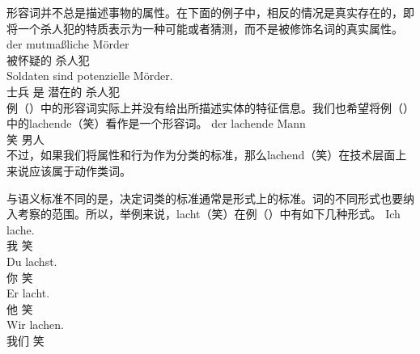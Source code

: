 形容词并不总是描述事物的属性。在下面的例子中，相反的情况是真实存在的，即将一个杀人犯的特质表示为一种可能或者猜测，而不是被修饰名词的真实属性。
\eal
\ex 
\gll der mutmaßliche Mörder\\
      被怀疑的 杀人犯\\
\ex 
\gll Soldaten sind potenzielle Mörder.\\
     士兵 是 潜在的 杀人犯\\
\zl
例（）中的形容词实际上并没有给出所描述实体的特征信息。我们也希望将例（）中的lachende（笑）看作是一个形容词。
\ea
\gll der lachende Mann\\
	  笑 男人\\
\z
不过，如果我们将属性和行为作为分类的标准，那么lachend（笑）在技术层面上来说应该属于动作类词。

与语义标准不同的是，决定词类的标准通常是形式上的标准。词的不同形式也要纳入考察的范围。所以，举例来说，lacht（笑）在例（）中有如下几种形式。
\addlines
\eal
\ex 
\gll Ich lache.\\
     我 笑\\
\ex 
\gll Du lachst.\\
     你 笑\\
\ex 
\gll Er lacht.\\
     他 笑\\
\ex 
\gll Wir lachen.\\
     我们 笑\\
     

